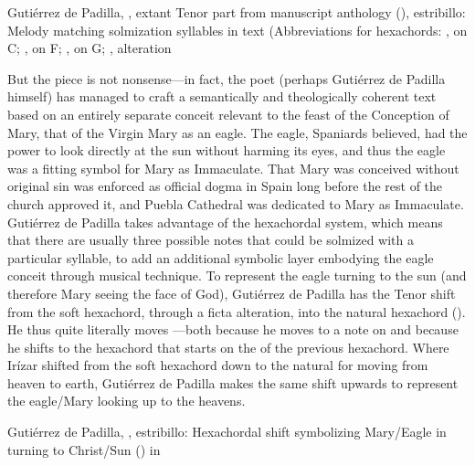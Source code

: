 
{Gutiérrez de Padilla, , extant Tenor part from
manuscript anthology (), estribillo: Melody matching
solmization syllables in text (Abbreviations for hexachords: ,
 on C; ,  on F; , 
on G; ,  alteration}

But the piece is not nonsense---in fact, the poet (perhaps Gutiérrez de Padilla
himself) has managed to craft a semantically and theologically coherent text
based on an entirely separate conceit relevant to the feast of the Conception
of Mary, that of the Virgin Mary as an eagle.
The eagle, Spaniards believed, had the power to look directly at the sun
without harming its eyes, and thus the eagle was a fitting symbol for Mary as
Immaculate.%
    \Autocite[]{Covarrubias:Tesoro} %
That Mary was conceived without original sin was enforced as official dogma in
Spain long before the rest of the church approved it, and Puebla Cathedral was
dedicated to Mary as Immaculate.
Gutiérrez de Padilla takes advantage of the hexachordal system, which means
that there are usually three possible notes that could be solmized with a
particular syllable, to add an additional symbolic layer embodying the eagle
conceit through musical technique.
To represent the eagle turning to the sun (and therefore Mary seeing the face
of God), Gutiérrez de Padilla has the Tenor shift from the soft hexachord,
through a ficta alteration, into the natural hexachord
().
He thus quite literally moves ---both because he moves to a
note on  and because he shifts to the hexachord that starts on the
 of the previous hexachord.
Where Irízar shifted from the soft hexachord down to the natural for moving from
heaven to earth, Gutiérrez de Padilla makes the same shift upwards to represent
the eagle/Mary looking up to the heavens.


{Gutiérrez de Padilla, , estribillo: Hexachordal shift
symbolizing Mary/Eagle in  turning to
Christ/Sun () in }

